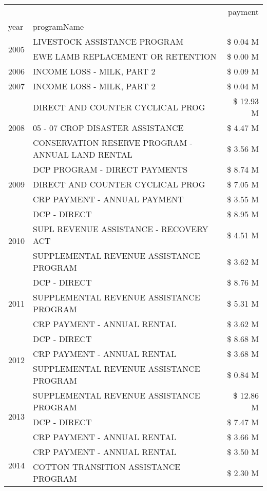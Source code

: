 \begin{tabular}{llr}
\toprule
 &  & payment \\
year & programName &  \\
\midrule
\multirow[t]{2}{*}{2005} & LIVESTOCK ASSISTANCE PROGRAM & \$ 0.04 M \\
 & EWE LAMB REPLACEMENT OR RETENTION & \$ 0.00 M \\
\cline{1-3}
2006 & INCOME LOSS - MILK, PART 2 & \$ 0.09 M \\
\cline{1-3}
2007 & INCOME LOSS - MILK, PART 2 & \$ 0.04 M \\
\cline{1-3}
\multirow[t]{3}{*}{2008} & DIRECT AND COUNTER CYCLICAL PROG & \$ 12.93 M \\
 & 05 - 07 CROP DISASTER ASSISTANCE & \$ 4.47 M \\
 & CONSERVATION RESERVE PROGRAM - ANNUAL LAND RENTAL & \$ 3.56 M \\
\cline{1-3}
\multirow[t]{3}{*}{2009} & DCP PROGRAM - DIRECT PAYMENTS & \$ 8.74 M \\
 & DIRECT AND COUNTER CYCLICAL PROG & \$ 7.05 M \\
 & CRP PAYMENT - ANNUAL PAYMENT & \$ 3.55 M \\
\cline{1-3}
\multirow[t]{3}{*}{2010} & DCP - DIRECT & \$ 8.95 M \\
 & SUPL REVENUE ASSISTANCE - RECOVERY ACT & \$ 4.51 M \\
 & SUPPLEMENTAL REVENUE ASSISTANCE PROGRAM & \$ 3.62 M \\
\cline{1-3}
\multirow[t]{3}{*}{2011} & DCP - DIRECT & \$ 8.76 M \\
 & SUPPLEMENTAL REVENUE ASSISTANCE PROGRAM & \$ 5.31 M \\
 & CRP PAYMENT - ANNUAL RENTAL & \$ 3.62 M \\
\cline{1-3}
\multirow[t]{3}{*}{2012} & DCP - DIRECT & \$ 8.68 M \\
 & CRP PAYMENT - ANNUAL RENTAL & \$ 3.68 M \\
 & SUPPLEMENTAL REVENUE ASSISTANCE PROGRAM & \$ 0.84 M \\
\cline{1-3}
\multirow[t]{3}{*}{2013} & SUPPLEMENTAL REVENUE ASSISTANCE PROGRAM & \$ 12.86 M \\
 & DCP - DIRECT & \$ 7.47 M \\
 & CRP PAYMENT - ANNUAL RENTAL & \$ 3.66 M \\
\cline{1-3}
\multirow[t]{3}{*}{2014} & CRP PAYMENT - ANNUAL RENTAL & \$ 3.50 M \\
 & COTTON TRANSITION ASSISTANCE PROGRAM & \$ 2.30 M \\

\end{tabular}
